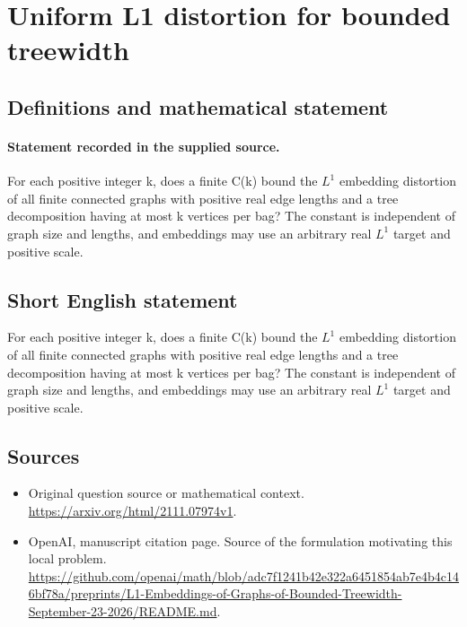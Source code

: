 \documentclass[11pt]{article}
\begin{document}
\section*{Uniform L1 distortion for bounded treewidth}\label{statement}
\subsection{Definitions and mathematical statement}
\paragraph{Statement recorded in the supplied source.}
For each positive integer k, does a finite C(k) bound the $L^{1}$ embedding distortion of all finite connected graphs with positive real edge lengths and a tree decomposition having at most k vertices per bag? The constant is independent of graph size and lengths, and embeddings may use an arbitrary real $L^{1}$ target and positive scale.
\subsection{Short English statement}
For each positive integer k, does a finite C(k) bound the $L^{1}$ embedding distortion of all finite connected graphs with positive real edge lengths and a tree decomposition having at most k vertices per bag? The constant is independent of graph size and lengths, and embeddings may use an arbitrary real $L^{1}$ target and positive scale.
\subsection{Sources}
\begin{itemize}
\item[S1] Original question source or mathematical context.
\url{https://arxiv.org/html/2111.07974v1}.
\item[S2] OpenAI, manuscript citation page. Source of the formulation motivating this local problem.
\url{https://github.com/openai/math/blob/adc7f1241b42e322a6451854ab7e4b4c146bf78a/preprints/L1-Embeddings-of-Graphs-of-Bounded-Treewidth-September-23-2026/README.md}.
\end{itemize}
\end{document}

